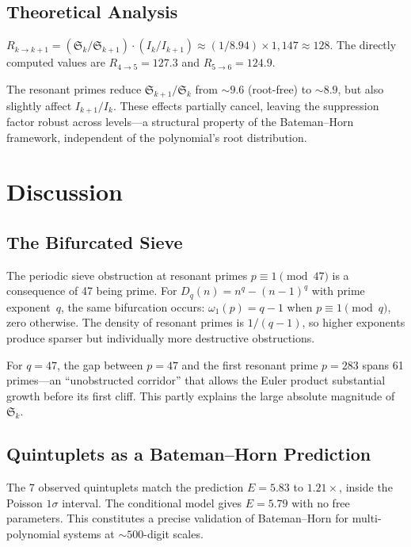 \documentclass[11pt,a4paper]{article}
\begin{document}
\subsection{Theoretical Analysis}

$R_{k \to k+1} = (\mathfrak{S}_k / \mathfrak{S}_{k+1}) \cdot
(I_k / I_{k+1}) \approx (1/8.94) \times 1{,}147 \approx 128.$
The directly computed values are $R_{4 \to 5} = 127.3$ and
$R_{5 \to 6} = 124.9$.

The resonant primes reduce $\mathfrak{S}_{k+1}/\mathfrak{S}_k$
from ${\sim}9.6$ (root-free) to ${\sim}8.9$, but also slightly
affect $I_{k+1}/I_k$.  These effects partially cancel, leaving the
suppression factor robust across levels---a structural property of
the Bateman--Horn framework, independent of the polynomial's root
distribution.


\section{Discussion}

\subsection{The Bifurcated Sieve}

The periodic sieve obstruction at resonant primes
$p \equiv 1 \pmod{47}$ is a consequence of 47 being prime.
For $D_q(n) = n^q - (n{-}1)^q$ with prime exponent~$q$,
the same bifurcation occurs: $\omega_1(p) = q - 1$ when
$p \equiv 1 \pmod{q}$, zero otherwise.  The density of resonant
primes is $1/(q{-}1)$, so higher exponents produce sparser but
individually more destructive obstructions.

For $q = 47$, the gap between $p = 47$ and the first resonant
prime $p = 283$ spans 61 primes---an ``unobstructed corridor''
that allows the Euler product substantial growth before its
first cliff.  This partly explains the large absolute magnitude
of $\mathfrak{S}_k$.

\subsection{Quintuplets as a Bateman--Horn Prediction}

The 7 observed quintuplets match the prediction $E = 5.83$ to
$1.21{\times}$, inside the Poisson $1\sigma$ interval.  The
conditional model gives $E = 5.79$ with no free parameters.
This constitutes a precise validation of Bateman--Horn for
multi-polynomial systems at ${\sim}500$-digit scales.
\end{document}
